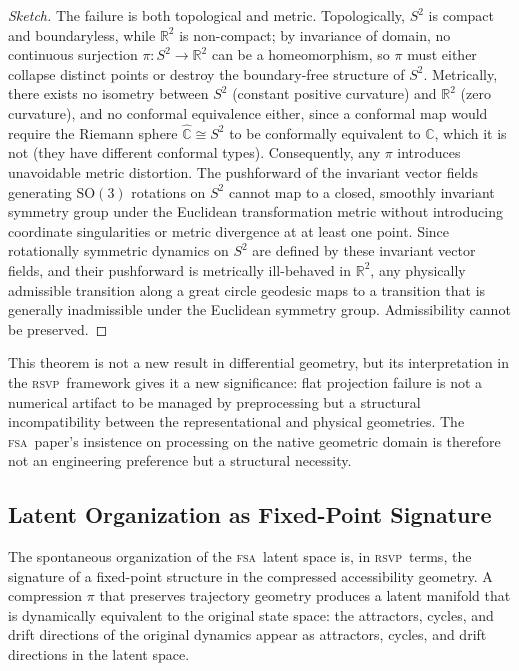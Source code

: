 \documentclass[11pt,a4paper]{article}
\theoremstyle{plain}
\theoremstyle{definition}
\theoremstyle{remark}
\newcommand{\RSVP}{\textup{\textsc{rsvp}}}
\newcommand{\FSA}{\textup{\textsc{fsa}}}
\begin{document}
\begin{proof}[Sketch]
The failure is both topological and metric. Topologically, $S^2$ is compact
and boundaryless, while $\mathbb{R}^2$ is non-compact; by invariance of
domain, no continuous surjection $\pi: S^2 \to \mathbb{R}^2$ can be a
homeomorphism, so $\pi$ must either collapse distinct points or destroy the
boundary-free structure of $S^2$. Metrically, there exists no isometry
between $S^2$ (constant positive curvature) and $\mathbb{R}^2$ (zero
curvature), and no conformal equivalence either, since a conformal map would
require the Riemann sphere $\hat{\mathbb{C}} \cong S^2$ to be conformally
equivalent to $\mathbb{C}$, which it is not (they have different conformal
types). Consequently, any $\pi$ introduces unavoidable metric distortion.
The pushforward of the invariant vector fields generating $\mathrm{SO}(3)$
rotations on $S^2$ cannot map to a closed, smoothly invariant symmetry
group under the Euclidean transformation metric without introducing
coordinate singularities or metric divergence at at least one point. Since
rotationally symmetric dynamics on $S^2$ are defined by these invariant
vector fields, and their pushforward is metrically ill-behaved in
$\mathbb{R}^2$, any physically admissible transition along a great circle
geodesic maps to a transition that is generally inadmissible under the
Euclidean symmetry group. Admissibility cannot be preserved.
\end{proof}

This theorem is not a new result in differential geometry, but its
interpretation in the \RSVP\ framework gives it a new significance: flat
projection failure is not a numerical artifact to be managed by
preprocessing but a structural incompatibility between the representational
and physical geometries. The \FSA\ paper's insistence on processing on the
native geometric domain is therefore not an engineering preference but a
structural necessity.

\subsection{Latent Organization as Fixed-Point Signature}

The spontaneous organization of the \FSA\ latent space is, in \RSVP\
terms, the signature of a fixed-point structure in the compressed
accessibility geometry. A compression $\pi$ that preserves trajectory
geometry produces a latent manifold that is dynamically equivalent to the
original state space: the attractors, cycles, and drift directions of the
original dynamics appear as attractors, cycles, and drift directions in
the latent space.
\end{document}

